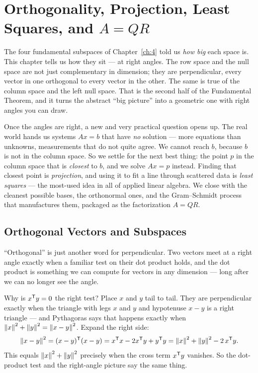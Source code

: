 \chapter{Orthogonality, Projection, Least Squares, and $A=QR$}
\label{ch:5}

The four fundamental subspaces of Chapter~\ref{ch:4} told us \emph{how big} each space is. This chapter tells us how they sit --- at right angles. The row space and the null space are not just complementary in dimension; they are perpendicular, every vector in one orthogonal to every vector in the other. The same is true of the column space and the left null space. That is the second half of the Fundamental Theorem, and it turns the abstract ``big picture'' into a geometric one with right angles you can draw.

Once the angles are right, a new and very practical question opens up. The real world hands us systems $Ax=b$ that have \emph{no} solution --- more equations than unknowns, measurements that do not quite agree. We cannot reach $b$, because $b$ is not in the column space. So we settle for the next best thing: the point $p$ in the column space that is \emph{closest} to $b$, and we solve $Ax=p$ instead. Finding that closest point is \emph{projection}, and using it to fit a line through scattered data is \emph{least squares} --- the most-used idea in all of applied linear algebra. We close with the cleanest possible bases, the orthonormal ones, and the Gram--Schmidt process that manufactures them, packaged as the factorization $A=QR$.

\section{Orthogonal Vectors and Subspaces}

``Orthogonal'' is just another word for perpendicular. Two vectors meet at a right angle exactly when a familiar test on their dot product holds, and the dot product is something we can compute for vectors in any dimension --- long after we can no longer see the angle.


Why is $x^{\mathsf T} y=0$ the right test? Place $x$ and $y$ tail to tail. They are perpendicular exactly when the triangle with legs $x$ and $y$ and hypotenuse $x-y$ is a right triangle --- and Pythagoras says that happens exactly when $\left\|x\right\|^2+\left\|y\right\|^2=\left\|x-y\right\|^2$. Expand the right side:
\[
   \left\|x-y\right\|^2 = (x-y)^{\mathsf T}(x-y) = x^{\mathsf T} x - 2x^{\mathsf T} y + y^{\mathsf T} y = \left\|x\right\|^2 + \left\|y\right\|^2 - 2\,x^{\mathsf T} y .
\]
This equals $\left\|x\right\|^2+\left\|y\right\|^2$ precisely when the cross term $x^{\mathsf T} y$ vanishes. So the dot-product test and the right-angle picture say the same thing.

